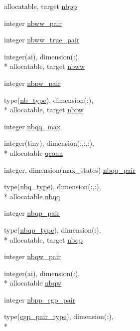 \begin{DoxyCompactItemize}
allocatable, target \hyperlink{classmd_adfb1f361ae92fbae49db0f6a0c32e51b}{nbpp}
\item 
integer \hyperlink{classmd_afc892dd0e6e7e751f24add805282c9f0}{nbww\-\_\-pair}
\item 
integer \hyperlink{classmd_aa0751148c3e030ed0ba6da70b13c204b}{nbww\-\_\-true\-\_\-pair}
\item 
integer(ai), dimension(\-:), \\*
allocatable, target \hyperlink{classmd_a05eb466b8d0cbe3a12c21670722ade47}{nbww}
\item 
integer \hyperlink{classmd_ac187aeca7638bc332f2744243e84444a}{nbpw\-\_\-pair}
\item 
type(\hyperlink{structmd_1_1nb__type}{nb\-\_\-type}), dimension(\-:), \\*
allocatable, target \hyperlink{classmd_acdc177734b28c55ef6c7f3d93703f6e0}{nbpw}
\item 
integer \hyperlink{classmd_a14bafb566028a8a6aa64a8c8a05da277}{nbqq\-\_\-max}
\item 
integer(tiny), dimension(\-:,\-:,\-:), \\*
allocatable \hyperlink{classmd_a9826652aaba721f80ac804293e7634d0}{qconn}
\item 
integer, dimension(max\-\_\-states) \hyperlink{classmd_a41e24bb8f16beabed196a1537539bdd2}{nbqq\-\_\-pair}
\item 
type(\hyperlink{structmd_1_1nbq__type}{nbq\-\_\-type}), dimension(\-:,\-:), \\*
allocatable \hyperlink{classmd_a1b7227f6d44f695169102680b62973a0}{nbqq}
\item 
integer \hyperlink{classmd_a3700e000587436c6cbba686979bf24bb}{nbqp\-\_\-pair}
\item 
type(\hyperlink{structmd_1_1nbqp__type}{nbqp\-\_\-type}), dimension(\-:), \\*
allocatable, target \hyperlink{classmd_a0caebab269d51bb189aa2740107013ce}{nbqp}
\item 
integer \hyperlink{classmd_a02693a554947ac1e9b8b8e83e85f46b8}{nbqw\-\_\-pair}
\item 
integer(ai), dimension(\-:), \\*
allocatable \hyperlink{classmd_a9ee60541bbec79e24a577be3905cc720}{nbqw}
\item 
integer \hyperlink{classmd_a434ce36afe2ea6dccbe1ea8d7ba33639}{nbpp\-\_\-cgp\-\_\-pair}
\item 
type(\hyperlink{structmd_1_1cgp__pair__type}{cgp\-\_\-pair\-\_\-type}), dimension(\-:), \\*

\end{DoxyCompactItemize}
